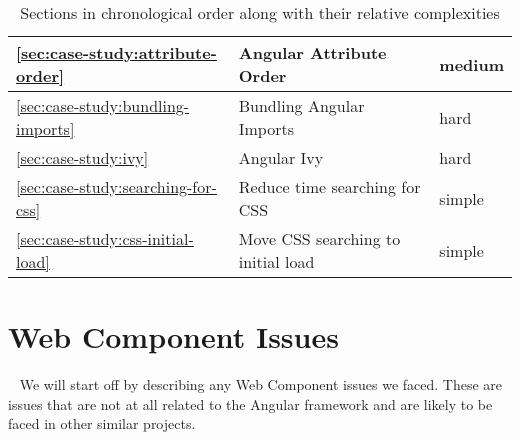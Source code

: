 \begin{table}[h]
\begin{tabularx}{\textwidth}{|l|X|l|}
    \ref{sec:case-study:attribute-order}        & Angular Attribute Order            & medium                       \\ \hline
    \ref{sec:case-study:bundling-imports}       & Bundling Angular Imports           & hard                         \\ \hline
    \ref{sec:case-study:ivy}                    & Angular Ivy                        & hard                         \\ \hline
    \ref{sec:case-study:searching-for-css}      & Reduce time searching for CSS      & simple                       \\ \hline
    \ref{sec:case-study:css-initial-load}       & Move CSS searching to initial load & simple                       \\
  \end{tabularx}
  \caption{Sections in chronological order along with their relative complexities}
  \label{tab:case-study:chronological-issues}
\end{table}

\section{Web Component Issues}~\label{sec:web-component-issues}
We will start off by describing any Web Component issues we faced. These are issues that are not at all related to the Angular framework and are likely to be faced in other similar projects.

